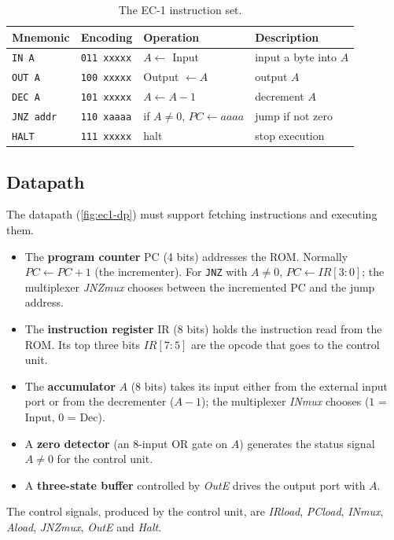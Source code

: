 \begin{table}[htbp]
\centering
\caption{The EC-1 instruction set.}
\label{tab:ec1-is}
\begin{tabular}{llll}
\toprule
Mnemonic & Encoding & Operation & Description\\ \midrule
\texttt{IN A} & \texttt{011 xxxxx} & $A\leftarrow$ Input & input a byte into $A$\\
\texttt{OUT A} & \texttt{100 xxxxx} & Output $\leftarrow A$ & output $A$\\
\texttt{DEC A} & \texttt{101 xxxxx} & $A\leftarrow A-1$ & decrement $A$\\
\texttt{JNZ addr} & \texttt{110 xaaaa} & if $A\neq0$, $PC\leftarrow aaaa$ & jump if not zero\\
\texttt{HALT} & \texttt{111 xxxxx} & halt & stop execution\\ \bottomrule
\end{tabular}
\end{table}

\subsection{Datapath}
The datapath (\cref{fig:ec1-dp}) must support fetching instructions and executing them.
\begin{itemize}
  \item The \textbf{program counter} PC (4 bits) addresses the ROM. Normally $PC\leftarrow PC+1$ (the incrementer). For \texttt{JNZ} with $A\neq0$, $PC\leftarrow IR[3:0]$; the multiplexer \textit{JNZmux} chooses between the incremented PC and the jump address.
  \item The \textbf{instruction register} IR (8 bits) holds the instruction read from the ROM. Its top three bits $IR[7:5]$ are the opcode that goes to the control unit.
  \item The \textbf{accumulator} $A$ (8 bits) takes its input either from the external input port or from the decrementer ($A-1$); the multiplexer \textit{INmux} chooses ($1$ = Input, $0$ = Dec).
  \item A \textbf{zero detector} (an 8-input OR gate on $A$) generates the status signal $A\neq0$ for the control unit.
  \item A \textbf{three-state buffer} controlled by \textit{OutE} drives the output port with $A$.
\end{itemize}
The control signals, produced by the control unit, are \textit{IRload}, \textit{PCload}, \textit{INmux}, \textit{Aload}, \textit{JNZmux}, \textit{OutE} and \textit{Halt}.

